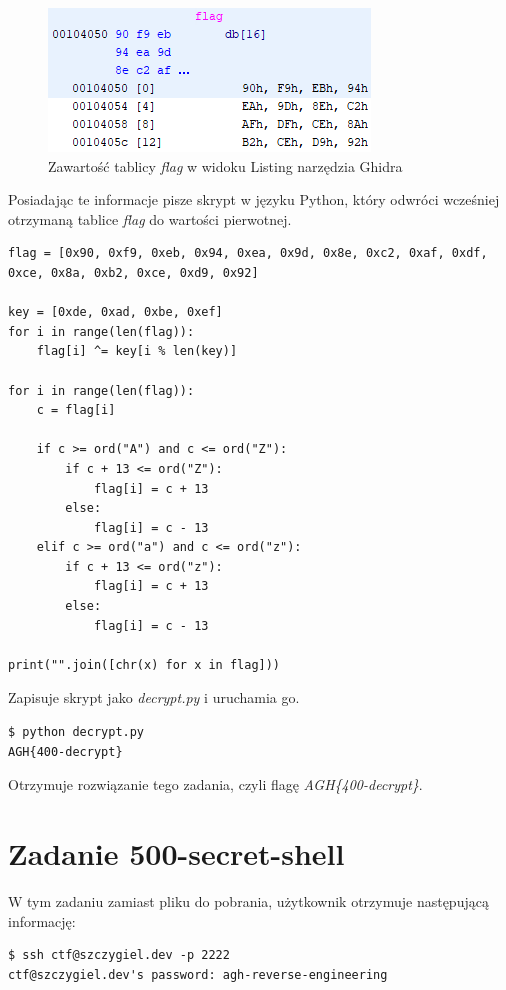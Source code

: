 \documentclass[language=polish,type=eng]{aghmodern}
\begin{document}
\begin{appendices}
\begin{figure}[H]
\centering
\includegraphics{400_flag}
\caption{Zawartość tablicy \emph{flag} w widoku Listing narzędzia Ghidra}
\end{figure}

Posiadając te informacje pisze skrypt w języku Python, który odwróci wcześniej otrzymaną
tablice \emph{flag} do wartości pierwotnej.

\begin{verbatim}
flag = [0x90, 0xf9, 0xeb, 0x94, 0xea, 0x9d, 0x8e, 0xc2, 0xaf, 0xdf, 0xce, 0x8a, 0xb2, 0xce, 0xd9, 0x92]

key = [0xde, 0xad, 0xbe, 0xef]
for i in range(len(flag)):
    flag[i] ^= key[i % len(key)]

for i in range(len(flag)):
    c = flag[i]

    if c >= ord("A") and c <= ord("Z"):
        if c + 13 <= ord("Z"):
            flag[i] = c + 13
        else:
            flag[i] = c - 13
    elif c >= ord("a") and c <= ord("z"):
        if c + 13 <= ord("z"):
            flag[i] = c + 13
        else:
            flag[i] = c - 13

print("".join([chr(x) for x in flag]))
\end{verbatim}

Zapisuje skrypt jako \emph{decrypt.py} i uruchamia go.

\begin{verbatim}
$ python decrypt.py
AGH{400-decrypt}
\end{verbatim}

Otrzymuje rozwiązanie tego zadania, czyli flagę \emph{AGH\{400-decrypt\}}.

\section{Zadanie 500-secret-shell}

W tym zadaniu zamiast pliku do pobrania, użytkownik otrzymuje następującą informację:

\begin{verbatim}
$ ssh ctf@szczygiel.dev -p 2222
ctf@szczygiel.dev's password: agh-reverse-engineering
\end{verbatim}


\end{appendices}
\end{document}
